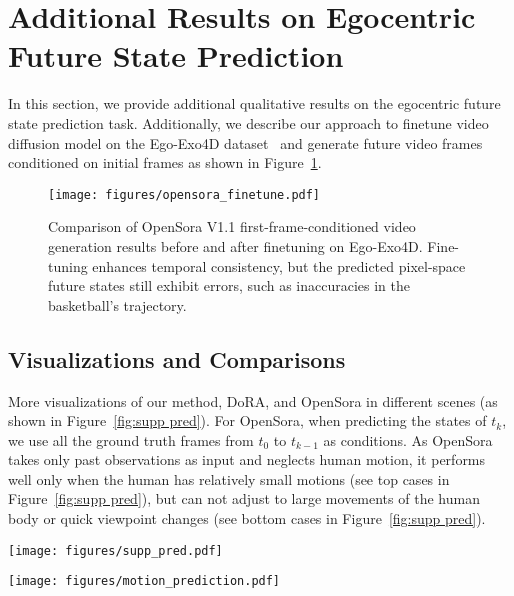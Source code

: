 \section{Additional Results on Egocentric Future State Prediction}

In this section, we provide additional qualitative results on the egocentric future state prediction task. Additionally, we describe our approach to finetune video diffusion model on the Ego-Exo4D dataset~\cite{grauman2024ego} and generate future video frames conditioned on initial frames as shown in Figure~\ref{fig:opensora_finetune}.

\begin{figure}[b]
    \centering
    \texttt{[image: figures/opensora\_finetune.pdf]}
    \caption{Comparison of OpenSora V1.1 first-frame-conditioned video generation results before and after finetuning on Ego-Exo4D. Fine-tuning enhances temporal consistency, but the predicted pixel-space future states still exhibit errors, such as inaccuracies in the basketball's trajectory.}
    \label{fig:opensora_finetune}
\end{figure}

\subsection{Visualizations and Comparisons}

More visualizations of our method, DoRA, and OpenSora in different scenes (as shown in Figure~\ref{fig:supp pred}). For OpenSora, when predicting the states of $t_k$, we use all the ground truth frames from $t_{0}$ to $t_{k-1}$ as conditions. As OpenSora takes only past observations as input and neglects human motion, it performs well only when the human has relatively small motions (see top cases in Figure~\ref{fig:supp pred}), but can not adjust to large movements of the human body or quick viewpoint changes (see bottom cases in Figure~\ref{fig:supp pred}).

\begin{figure*}
    \centering
    \texttt{[image: figures/supp\_pred.pdf]}
    \caption{Retrieval and generation results for egocentric future state prediction. Correct and wrong retrieval images are marked with green and red boundaries, respectively.}
    \label{fig:supp pred}
\end{figure*}

\begin{figure*}[t]
    \centering
    \texttt{[image: figures/motion\_prediction.pdf]}
    \vspace{-0.5mm}
    \caption{Motion prediction results in scenes with minor changes in observation.}
    \vspace{-1.5mm}
    \label{fig:motion_prediction}
\end{figure*}

